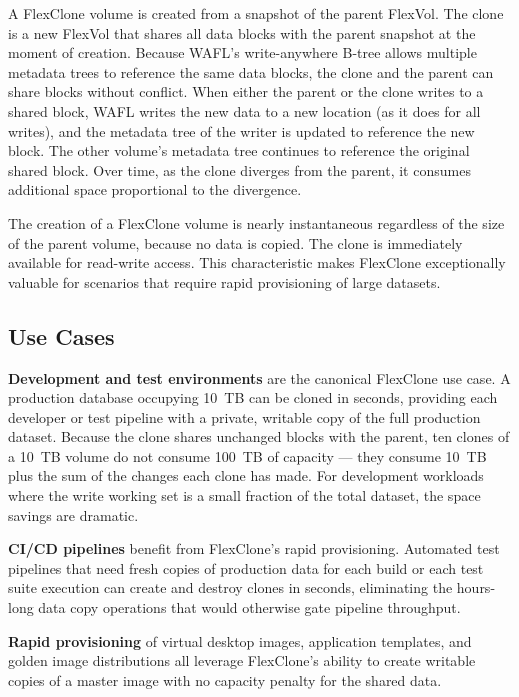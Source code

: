 A FlexClone volume is created from a snapshot of the parent FlexVol. The clone is a new FlexVol that shares all data blocks with the parent snapshot at the moment of creation. Because WAFL's write-anywhere B-tree allows multiple metadata trees to reference the same data blocks, the clone and the parent can share blocks without conflict. When either the parent or the clone writes to a shared block, WAFL writes the new data to a new location (as it does for all writes), and the metadata tree of the writer is updated to reference the new block. The other volume's metadata tree continues to reference the original shared block. Over time, as the clone diverges from the parent, it consumes additional space proportional to the divergence.

The creation of a FlexClone volume is nearly instantaneous regardless of the size of the parent volume, because no data is copied. The clone is immediately available for read-write access. This characteristic makes FlexClone exceptionally valuable for scenarios that require rapid provisioning of large datasets.

\subsection{Use Cases}

\textbf{Development and test environments} are the canonical FlexClone use case. A production database occupying 10~TB can be cloned in seconds, providing each developer or test pipeline with a private, writable copy of the full production dataset. Because the clone shares unchanged blocks with the parent, ten clones of a 10~TB volume do not consume 100~TB of capacity --- they consume 10~TB plus the sum of the changes each clone has made. For development workloads where the write working set is a small fraction of the total dataset, the space savings are dramatic.

\textbf{CI/CD pipelines} benefit from FlexClone's rapid provisioning. Automated test pipelines that need fresh copies of production data for each build or each test suite execution can create and destroy clones in seconds, eliminating the hours-long data copy operations that would otherwise gate pipeline throughput.

\textbf{Rapid provisioning} of virtual desktop images, application templates, and golden image distributions all leverage FlexClone's ability to create writable copies of a master image with no capacity penalty for the shared data.

